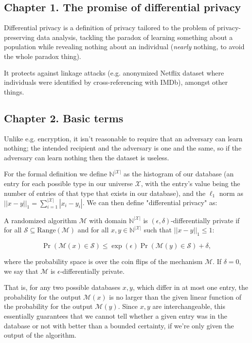 \documentclass[a4paper]{article}
\begin{document}
\subsection{Chapter 1. The promise of differential privacy}

Differential privacy is a definition of privacy tailored to the problem of privacy-preserving data analysis, tackling the paradox of learning something about a population while revealing nothing about an individual (\textit{nearly} nothing, to avoid the whole paradox thing).

It protects against linkage attacks (e.g. anonymized Netflix dataset where individuals were identified by cross-referencing with IMDb), amongst other things.

\subsection{Chapter 2. Basic terms}

Unlike e.g. encryption, it isn't reasonable to require that an adversary can learn nothing; the intended recipient and the adversary is one and the same, so if the adversary can learn nothing then the dataset is useless. \bigskip

For the formal definition we define $\mathbb{N}^{|\mathcal{X}|}$ as the histogram of our database (an entry for each possible type in our universe $\mathcal{X}$, with the entry's value being the number of entries of that type that exists in our database), and the $\ell_1$ norm as $||x-y||_1 = \sum_{i=1}^{|\mathcal{X}|} |x_i - y_i|$. We can then define "differential privacy" as:

\begin{mdframed}
    A randomized algorithm $\mathcal{M}$ with domain $\mathbb{N}^{|\mathcal{X}|}$ is $(\epsilon, \delta)$-differentially private if for all $\mathcal{S} \subseteq \text{Range}(\mathcal{M})$ and for all $x,y \in \mathbb{N}^{|\mathcal{X}|}$ such that $||x-y||_1 \leq 1$:
    
    $$\Pr(\mathcal{M}(x) \in \mathcal{S}) \leq \exp(\epsilon) \Pr(\mathcal{M}(y) \in \mathcal{S}) + \delta,$$
    
    where the probability space is over the coin flips of the mechanism $\mathcal{M}$. If $\delta=0$, we say that $\mathcal{M}$ is $\epsilon$-differentially private.
\end{mdframed}

That is, for any two possible databases $x,y$, which differ in at most one entry, the probability for the output $\mathcal{M}(x)$ is no larger than the given linear function of the probability for the output $\mathcal{M}(y)$. Since $x,y$ are interchangeable, this essentially guarantees that we cannot tell whether a given entry was in the database or not with better than a bounded certainty, if we're only given the output of the algorithm. \bigskip
\end{document}
